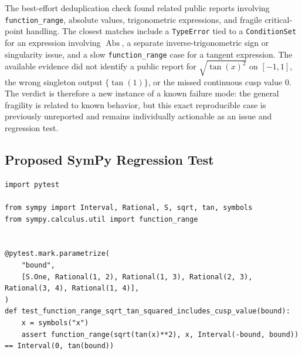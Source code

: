 \documentclass[11pt]{article}
\begin{document}
The best-effort deduplication check found related public reports involving
\texttt{function\_range}, absolute values, trigonometric expressions, and
fragile critical-point handling. The closest matches include a \texttt{TypeError}
tied to a \texttt{ConditionSet} for an expression involving
\(\operatorname{Abs}\), a separate inverse-trigonometric sign or singularity
issue, and a slow \texttt{function\_range} case for a tangent expression. The
available evidence did not identify a public report for \(\sqrt{\tan(x)^2}\) on
\([-1,1]\), the wrong singleton output \(\{\tan(1)\}\), or the missed continuous
cusp value \(0\). The verdict is therefore a new instance of a known failure
mode: the general fragility is related to known behavior, but this exact
reproducible case is previously unreported and remains individually actionable
as an issue and regression test.

\subsection{Proposed SymPy Regression Test}

\medskip

\begin{lstlisting}[style=bugpython]
import pytest

from sympy import Interval, Rational, S, sqrt, tan, symbols
from sympy.calculus.util import function_range


@pytest.mark.parametrize(
    "bound",
    [S.One, Rational(1, 2), Rational(1, 3), Rational(2, 3), Rational(3, 4), Rational(1, 4)],
)
def test_function_range_sqrt_tan_squared_includes_cusp_value(bound):
    x = symbols("x")
    assert function_range(sqrt(tan(x)**2), x, Interval(-bound, bound)) == Interval(0, tan(bound))
\end{lstlisting}
\end{document}
